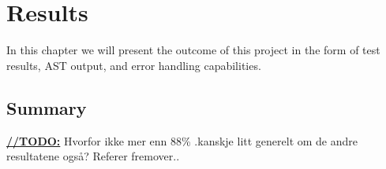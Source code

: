 \chapter{Results}
In this chapter we will present the outcome of this project in the form of test
results, AST output, and error handling capabilities.





\section{Summary}
\underline{\textbf{\LARGE //TODO:}} Hvorfor ikke mer enn 88\% .kanskje litt generelt om de andre resultatene ogs\aa ? Referer fremover..